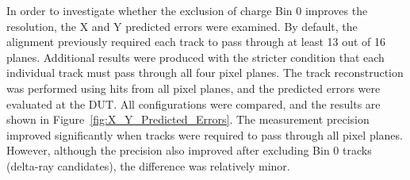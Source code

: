 In order to investigate whether the exclusion of charge Bin 0 improves the resolution, the X and Y predicted errors were examined. By default, the alignment previously required each track to pass through at least 13 out of 16 planes. Additional results were produced with the stricter condition that each individual track must pass through all four pixel planes. The track reconstruction was performed using hits from all pixel planes, and the predicted errors were evaluated at the DUT. All configurations were compared, and the results are shown in Figure~\ref{fig:X_Y_Predicted_Errors}. The measurement precision improved significantly when tracks were required to pass through all pixel planes. However, although the precision also improved after excluding Bin 0 tracks (delta-ray candidates), the difference was relatively minor.

